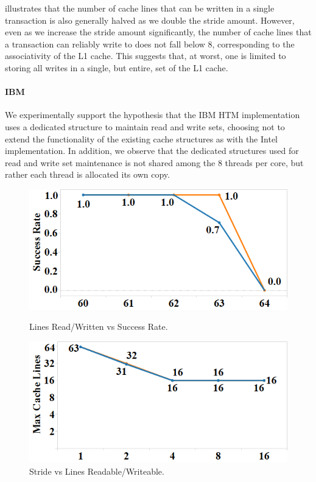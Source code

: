  illustrates that the number of cache
lines that can be written in a single transaction 
is also generally halved as we
double the stride amount.  However, even as we increase the stride amount
significantly, the number of cache lines that a 
transaction can reliably write
to does not fall below 8, corresponding to the associativity 
of the L1 cache.  This suggests that, at worst, one is limited 
to storing all writes in a single, but entire, set of the L1 cache.

\paragraph{IBM}
We experimentally support the hypothesis
that the IBM HTM implementation uses a dedicated structure
to maintain read and write sets, choosing not to extend the 
functionality of the existing cache structures as with
the Intel implementation.  In addition, we observe
that the dedicated structures used for read and write set
maintenance is not shared among the 8 threads per core, but rather
each thread is allocated its own copy.

\begin{figure}[h]%
\centering
\begin{minipage}[b]{.45\linewidth}
\centering
\includegraphics[width=\linewidth]{images/wttm_capacity_readwrite_ibm}
\caption{Lines Read/Written vs Success Rate.}
\label{fig:wttm_capacity_readwrite_ibm}
\end{minipage}%
\quad
\begin{minipage}[b]{.45\linewidth}%
\centering
\includegraphics[width=\linewidth]{images/wttm_stride_readwrite_ibm}
\caption{Stride vs Lines Readable/Writeable.}
\label{fig:wttm_stride_readwrite_ibm}
\end{minipage}
\end{figure}

